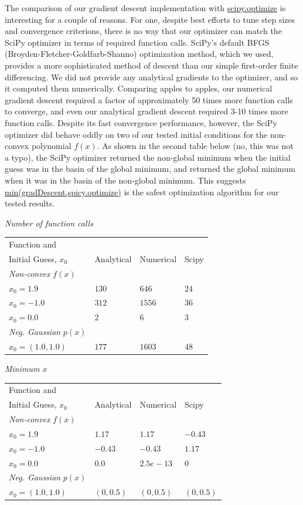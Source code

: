 \documentclass[10pt]{article}
\begin{document}
The comparison of our gradient descent implementation with \url{scipy.optimize} is interesting for a couple of reasons.  For one, despite best efforts to tune step sizes and convergence criterions, there is no way that our optimizer can match the SciPy optimizer in terms of required function calls.  SciPy's default BFGS (Broyden-Fletcher-Goldfarb-Shanno) optimization method, which we used, provides a more sophisticated method of descent than our simple first-order finite differencing.  We did not provide any analytical gradients to the optimizer, and so it computed them numerically.  Comparing apples to apples, our numerical gradient descent required a factor of approximately 50 times more function calls to converge, and even our analytical gradient descent required 3-10 times more function calls.  Despite its fast convergence performance, however, the SciPy optimizer did behave oddly on two of our tested initial conditions for the non-convex polynomial $f(x)$.  As shown in the second table below (no, this was not a typo), the SciPy optimizer returned the non-global minimum when the initial guess was in the basin of the global minimum, and returned the global minimum when it was in the basin of the non-global minimum.  This suggests \url{min(gradDescent,spicy.optimize)} is the safest optimization algorithm for our tested results.





\textit{Number of function calls}

\begin{tabular}{|l|l|l|l|}
\hline
Function and & & &\\ Initial Guess, $x_0$ & Analytical & Numerical & Scipy \\ \hline
\textit{Non-convex} $f(x)$ & & &\\ \hline
$x_0 = 1.9$ & $130$ & $646$ & $24$\\\hline
$x_0 = -1.0$ & $312$ & $1556$ & $36$ \\ \hline
$x_0 = 0.0$ & $2$ & $6$ & $3$\\ \hline
\textit{Neg. Gaussian} $p(x)$ & & & \\ \hline
$x_0 = (1.0,1.0)$ & $177$ & $1603$ & $48$ \\ \hline
\end{tabular}

\textit{Minimum $x$}

\begin{tabular}{|l|l|l|l|}
\hline
Function and & & &\\ Initial Guess, $x_0$ & Analytical & Numerical & Scipy \\ \hline
\textit{Non-convex} $f(x)$ & & &\\ \hline
$x_0 = 1.9$ & $1.17$ & $1.17$ & $-0.43$\\\hline
$x_0 = -1.0$ & $-0.43$ & $-0.43$ & $1.17$ \\ \hline
$x_0 = 0.0$ & $0.0$ & $2.5e-13$ & $0$\\ \hline
\textit{Neg. Gaussian} $p(x)$ & & & \\ \hline
$x_0 = (1.0,1.0)$ & $(0,0.5)$ & $(0,0.5)$ & $(0,0.5)$ \\ \hline
\end{tabular}
\end{document}
